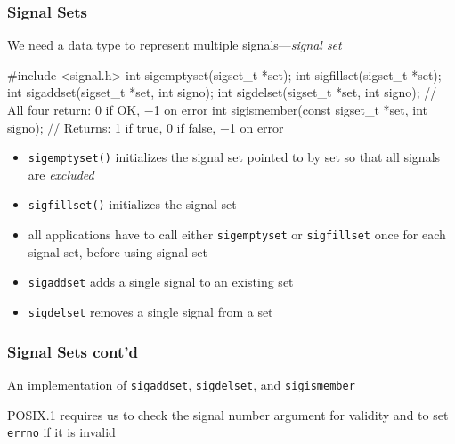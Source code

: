 \documentclass[newPxFont,sthlmFooter,nooffset]{beamer}
\begin{document}
\begin{frame}[fragile,t]
  \frametitle{Signal Sets}
We need a data type to represent multiple signals---\textit{signal set}

\begin{codedef}
#include <signal.h>
int sigemptyset(sigset_t *set);
int sigfillset(sigset_t *set);
int sigaddset(sigset_t *set, int signo); 
int sigdelset(sigset_t *set, int signo);
// All four return: 0 if OK, −1 on error 
int sigismember(const sigset_t *set, int signo);
// Returns: 1 if true, 0 if false, −1 on error
\end{codedef}

\begin{itemize}
\item \footnotesize \texttt{sigemptyset()} initializes the signal set pointed to by set so that all signals are \textit{excluded}
\item \footnotesize \texttt{sigfillset()} initializes the signal set
\item \footnotesize all applications have to call either \texttt{sigemptyset} or \texttt{sigfillset} once for each signal set, before using signal set
\item \footnotesize \texttt{sigaddset} adds a single signal to an existing set
\item \footnotesize \texttt{sigdelset} removes a single signal from a set
\end{itemize}

\end{frame}








\begin{frame}
  \frametitle{Signal Sets cont'd}
An implementation of \texttt{sigaddset}, \texttt{sigdelset}, and \texttt{sigismember}


POSIX.1 requires us to check the signal number argument for validity and to set \texttt{errno} if it is invalid
\end{frame}
\end{document}
